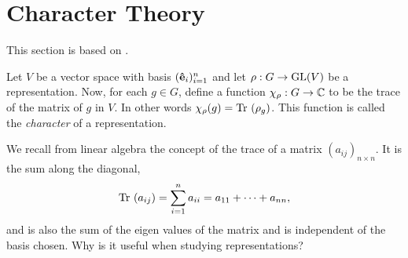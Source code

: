 \clearpage{\thispagestyle{empty}}
\section{Character Theory}

This section is based on \cite[Ch.2.]{Serre}.

Let $V$ be a vector space with basis $(\mathbf{\hat{e}}_i)_{i=1}^n$ and let $\rho: G \rightarrow \text{GL}(V)$ be a representation. Now, for each $g \in G$, define a function $\chi_{\rho}: G \rightarrow \mathbb{C}$ to be the trace of the matrix of $g$ in $V$. In other words $\chi_{\rho}(g) = \text{Tr }(\rho_g)$. This function is called the \emph{character} of a representation.

We recall from linear algebra the concept of the trace of a matrix $(a_{ij})_{n \times n}$. It is the sum along the diagonal,
\begin{align*}
	\text{Tr }(a_{ij})= \sum_{i=1}^{n} a_{ii} = a_{11} + \dots + a_{nn},
\end{align*}
and is also the sum of the eigen values of the matrix and is independent of the basis chosen. Why is it useful when studying representations?

